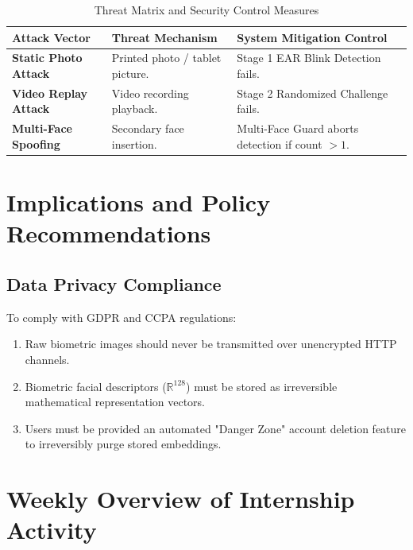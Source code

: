 \documentclass[12pt,a4paper,oneside]{article}
\begin{document}
\begin{table}[h!]
\centering
\renewcommand{\arraystretch}{1.3}
\caption{Threat Matrix and Security Control Measures}
\label{tab:security_threats}
\small
\begin{tabular}{|p{3.5cm}|p{5.5cm}|p{6.2cm}|}
\hline
\rowcolor{gray!15} \textbf{Attack Vector} & \textbf{Threat Mechanism} & \textbf{System Mitigation Control} \\ \hline
\textbf{Static Photo Attack} & Printed photo / tablet picture. & Stage 1 EAR Blink Detection fails. \\ \hline
\textbf{Video Replay Attack} & Video recording playback. & Stage 2 Randomized Challenge fails. \\ \hline
\textbf{Multi-Face Spoofing} & Secondary face insertion. & Multi-Face Guard aborts detection if count $> 1$. \\ \hline
\end{tabular}
\end{table}

\section{Implications and Policy Recommendations}
\label{sec:implications}

\subsection{Data Privacy Compliance}
To comply with GDPR and CCPA regulations:
\begin{enumerate}
    \item Raw biometric images should never be transmitted over unencrypted HTTP channels.
    \item Biometric facial descriptors ($\mathbb{R}^{128}$) must be stored as irreversible mathematical representation vectors.
    \item Users must be provided an automated "Danger Zone" account deletion feature to irreversibly purge stored embeddings.
\end{enumerate}

\section{Weekly Overview of Internship Activity}
\label{sec:weekly_overview}
\end{document}
